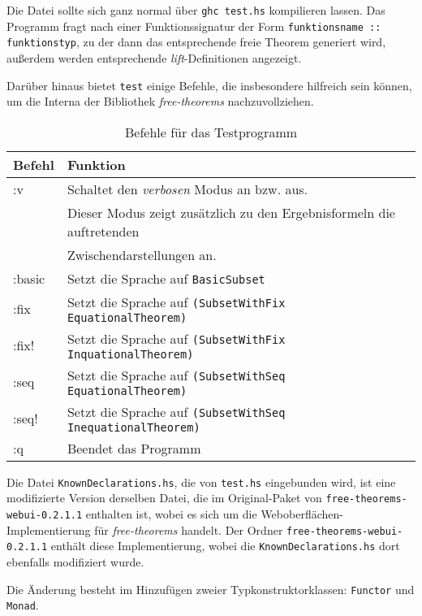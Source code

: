 Die Datei sollte sich ganz normal über \texttt{ghc test.hs} kompilieren lassen. Das Programm fragt nach einer
Funktionssignatur der Form \texttt{funktionsname :: funktionstyp}, zu der dann das entsprechende freie Theorem
generiert wird, außerdem werden entsprechende \textit{lift}-Definitionen angezeigt.

Darüber hinaus bietet \texttt{test} einige Befehle, die insbesondere hilfreich sein können, um die Interna der
Bibliothek \textit{free-theorems} nachzuvollziehen.

\begin{table}[ht]
\begin{tabular}{ | l | l | }
\hline
Befehl & Funktion \\
\hline
:v & Schaltet den \textit{verbosen} Modus an bzw. aus.\\
& Dieser Modus zeigt zusätzlich zu den Ergebnisformeln die auftretenden \\
& Zwischendarstellungen an. \\
:basic & Setzt die Sprache auf \texttt{BasicSubset} \\
:fix & Setzt die Sprache auf \texttt{(SubsetWithFix EquationalTheorem)} \\
:fix! & Setzt die Sprache auf \texttt{(SubsetWithFix InquationalTheorem)} \\
:seq & Setzt die Sprache auf \texttt{(SubsetWithSeq EquationalTheorem)} \\
:seq! & Setzt die Sprache auf \texttt{(SubsetWithSeq InequationalTheorem)} \\
:q & Beendet das Programm \\
\hline
\end{tabular}
\caption{Befehle für das Testprogramm}
\label{tab:commands}
\end{table}

Die Datei \texttt{KnownDeclarations.hs}, die von \texttt{test.hs} eingebunden wird, ist eine modifizierte Version
derselben Datei, die im Original-Paket von \texttt{free-theorems-webui-0.2.1.1} enthalten ist, wobei es sich um
die Weboberflächen-Implementierung für \textit{free-theorems} handelt. Der Ordner
\texttt{free-theorems-webui-0.2.1.1} enthält diese Implementierung, wobei die \texttt{KnownDeclarations.hs} dort
ebenfalls modifiziert wurde.

Die Änderung besteht im Hinzufügen zweier Typkonstruktorklassen: \texttt{Functor} und \texttt{Monad}.